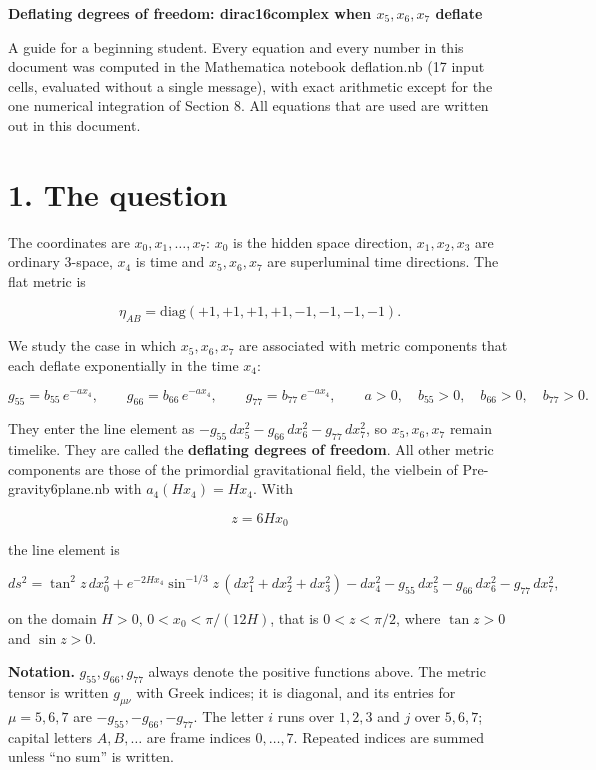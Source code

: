 \documentclass[10pt]{article}
\makeatletter
\newcommand\keepnext{\par\nopagebreak\@nobreaktrue\everypar{\@nobreakfalse\everypar{}}}
\makeatother
\begin{document}
{\raggedright\LARGE\bfseries Deflating degrees of freedom: dirac16complex when $x_5, x_6, x_7$ deflate\par}\medskip

A guide for a beginning student. Every equation and every number in this document was computed in the Mathematica notebook deflation.nb (17 input cells, evaluated without a single message), with exact arithmetic except for the one numerical integration of Section 8. All equations that are used are written out in this document.


\section*{1. The question}

The coordinates are $x_0, x_1, \dots, x_7$: $x_0$ is the hidden space direction, $x_1, x_2, x_3$ are ordinary 3-space, $x_4$ is time and $x_5, x_6, x_7$ are superluminal time directions. The flat metric is\keepnext


\[
\eta_{AB} = \mathrm{diag}(+1,+1,+1,+1,-1,-1,-1,-1) .
\]

We study the case in which $x_5, x_6, x_7$ are associated with metric components that each deflate exponentially in the time $x_4$:\keepnext


\[
g_{55} = b_{55}\,e^{-ax_4}, \qquad g_{66} = b_{66}\,e^{-ax_4}, \qquad g_{77} = b_{77}\,e^{-ax_4}, \qquad a > 0, \quad b_{55} > 0, \quad b_{66} > 0, \quad b_{77} > 0 .
\]

They enter the line element as $-g_{55}\,dx_5^2 - g_{66}\,dx_6^2 - g_{77}\,dx_7^2$, so $x_5, x_6, x_7$ remain timelike. They are called the \textbf{deflating degrees of freedom}. All other metric components are those of the primordial gravitational field, the vielbein of Pre-gravity6plane.nb with $a_4(Hx_4) = Hx_4$. With\keepnext


\[
z = 6Hx_0
\]

the line element is\keepnext


\[
ds^2 = \tan^2 z\,dx_0^2 + e^{-2Hx_4}\sin^{-1/3}z\,\left(dx_1^2 + dx_2^2 + dx_3^2\right) - dx_4^2 - g_{55}\,dx_5^2 - g_{66}\,dx_6^2 - g_{77}\,dx_7^2 ,
\]

on the domain $H > 0$, $0 < x_0 < \pi/(12H)$, that is $0 < z < \pi/2$, where $\tan z > 0$ and $\sin z > 0$.


\textbf{Notation.} $g_{55}, g_{66}, g_{77}$ always denote the positive functions above. The metric tensor is written $g_{\mu\nu}$ with Greek indices; it is diagonal, and its entries for $\mu = 5, 6, 7$ are $-g_{55}, -g_{66}, -g_{77}$. The letter $i$ runs over $1, 2, 3$ and $j$ over $5, 6, 7$; capital letters $A, B, \dots$ are frame indices $0, \dots, 7$. Repeated indices are summed unless ``no sum'' is written.
\end{document}
